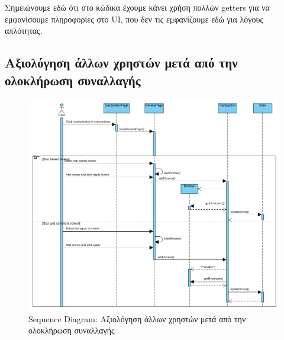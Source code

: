 \documentclass[12pt,a4paper]{article}
\begin{document}
Σημειώνουμε εδώ ότι στο κώδικα έχουμε κάνει χρήση πολλών getters για να εμφανίσουμε πληροφορίες στο UI, που δεν τις εμφανίζουμε εδώ για λόγους απλότητας.

\subsection{Αξιολόγηση άλλων χρηστών μετά από την ολοκλήρωση συναλλαγής}
\begin{figure}[H]
	\includegraphics[width=\textwidth]{Review after Transaction Sequence.png}
	\caption{Sequence Diagram: Αξιολόγηση άλλων χρηστών μετά από την ολοκλήρωση συναλλαγής}
	\label{Sequence Diagram: Αξιολόγηση άλλων χρηστών μετά από την ολοκλήρωση συναλλαγής}
\end{figure}
\end{document}
